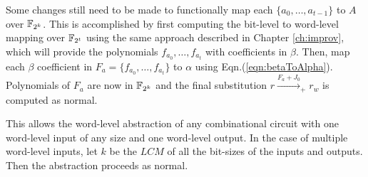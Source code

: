 Some changes still need to be made to
functionally map each $\{a_0,\dots,a_{t-1}\}$ to $A$ over ${\mathbb{F}}_{2^k}$. 
This is accomplished by first computing the bit-level to word-level mapping over 
${\mathbb{F}}_{2^t}$ using the same approach described in Chapter \ref{ch:improv}, which will provide
the polynomials $f_{a_0},\dots,f_{a_t}$ with coefficients in $\beta$. Then, map each $\beta$ 
coefficient in $F_a = \{f_{a_0},\dots,f_{a_t}\}$ to $\alpha$ using Eqn.(\ref{eqn:betaToAlpha}). 
Polynomials of $F_a$ are now in ${\mathbb{F}}_{2^k}$ and
the final substitution 
$r\xrightarrow{F_a+J_0}_+r_w$ is computed as normal. 

This allows the word-level abstraction of any combinational circuit with one
word-level input of any size and one word-level output. In the case of multiple
word-level inputs, let $k$ be the $LCM$ of all the bit-sizes of the inputs and
outputs. Then the abstraction proceeds as normal.


